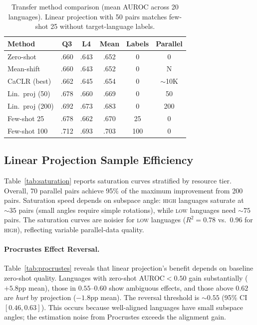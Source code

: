 \documentclass[11pt,a4paper]{article}
\newcommand{\auroc}{AUROC}
\begin{document}
\begin{table}[t]
\centering
\small
\begin{tabular}{lccccc}
\toprule
Method & Q3 & L4 & Mean & Labels & Parallel \\
\midrule
Zero-shot       & .660 & .643 & .652 & 0   & 0 \\
Mean-shift      & .660 & .643 & .652 & 0   & N \\
CaCLR (best)    & .662 & .645 & .654 & 0   & ${\sim}$10K \\
Lin.\ proj (50) & .678 & .660 & .669 & 0   & 50 \\
Lin.\ proj (200)& .692 & .673 & .683 & 0   & 200 \\
Few-shot 25     & .678 & .662 & .670 & 25  & 0 \\
Few-shot 100    & .712 & .693 & .703 & 100 & 0 \\
\bottomrule
\end{tabular}
\caption{Transfer method comparison (mean \auroc{} across 20 languages). Linear projection with 50 pairs matches few-shot 25 without target-language labels.}
\label{tab:methods}
\end{table}


\subsection{Linear Projection Sample Efficiency}
\label{sec:projection}

Table~\ref{tab:saturation} reports saturation curves stratified by resource tier. Overall, 70 parallel pairs achieve 95\% of the maximum improvement from 200 pairs. Saturation speed depends on subspace angle: \textsc{high} languages saturate at ${\sim}35$ pairs (small angles require simple rotations), while \textsc{low} languages need ${\sim}75$ pairs. The saturation curves are noisier for \textsc{low} languages ($R^2=0.78$ vs.\ 0.96 for \textsc{high}), reflecting variable parallel-data quality.

\paragraph{Procrustes Effect Reversal.}
Table~\ref{tab:procrustes} reveals that linear projection's benefit depends on baseline zero-shot quality. Languages with zero-shot \auroc{}$<0.50$ gain substantially ($+5.8$pp mean), those in $0.55$--$0.60$ show ambiguous effects, and those above $0.62$ are \emph{hurt} by projection ($-1.8$pp mean). The reversal threshold is ${\sim}0.55$ (95\% CI $[0.46, 0.63]$). This occurs because well-aligned languages have small subspace angles; the estimation noise from Procrustes exceeds the alignment gain.
\end{document}
